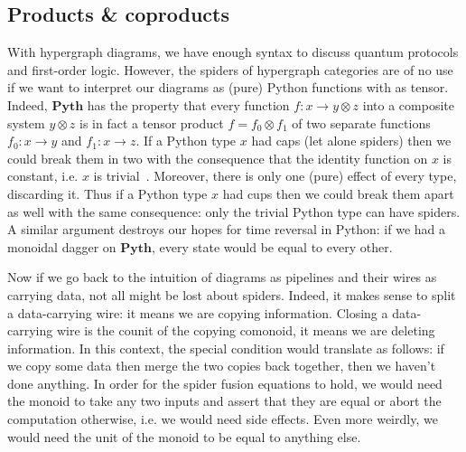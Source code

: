 
\subsection{Products \& coproducts} \label{subsection:cartesian}

With hypergraph diagrams, we have enough syntax to discuss quantum protocols and first-order logic.
However, the spiders of hypergraph categories are of no use if we want to interpret our diagrams as (pure) Python functions with  as tensor.
Indeed, $\mathbf{Pyth}$ has the property that every function $f : x \to y \otimes z$ into a composite system $y \otimes z$ is in fact a tensor product $f = f_0 \otimes f_1$ of two separate functions $f_0 : x \to y$ and $f_1 : x \to z$.
If a Python type $x$ had caps (let alone spiders) then we could break them in two with the consequence that the identity function on $x$ is constant, i.e. $x$ is trivial~\cite[?]{CoeckeKissinger17}.
Moreover, there is only one (pure) effect of every type, discarding it.
Thus if a Python type $x$ had cups then we could break them apart as well with the same consequence: only the trivial Python type can have spiders.
A similar argument destroys our hopes for time reversal in Python: if we had a monoidal dagger on $\mathbf{Pyth}$, every state would be equal to every other.

Now if we go back to the intuition of diagrams as pipelines and their wires as carrying data, not all might be lost about spiders.
Indeed, it makes sense to split a data-carrying wire: it means we are copying information.
Closing a data-carrying wire is the counit of the copying comonoid, it means we are deleting information.
In this context, the special condition would translate as follows: if we copy some data then merge the two copies back together, then we haven't done anything.
In order for the spider fusion equations to hold, we would need the monoid to take any two inputs and assert that they are equal or abort the computation otherwise, i.e. we would need side effects.
Even more weirdly, we would need the unit of the monoid to be equal to anything else.

